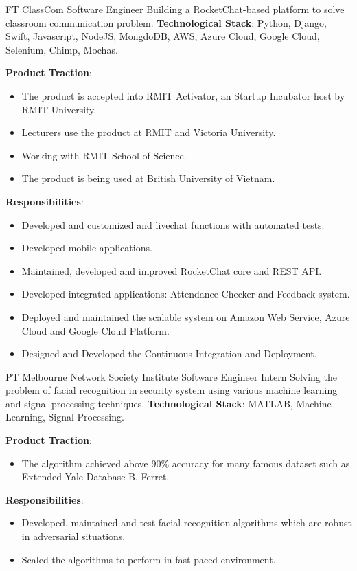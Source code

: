 \documentclass[12pt]{article} %
\begin{document}
\begin{paracol}{2}
{FT} %
{ClassCom} %
{Software Engineer} %
{Building a RocketChat-based platform to solve classroom communication problem.} %
{\textbf{Technological Stack}: Python, Django, Swift, Javascript, NodeJS, MongdoDB, AWS, Azure Cloud, Google Cloud, Selenium, Chimp, Mochas.}
{\textbf{Product Traction}: 
	\begin{itemize}
	\setlength{\itemsep}{1pt}	
	  \item The product is accepted into RMIT Activator, an Startup Incubator host by RMIT University.
	  \item Lecturers use the product at RMIT and Victoria University.
	  \item Working with RMIT School of Science.
	  \item The product is being used at British University of Vietnam.  
	\end{itemize}
\textbf{Responsibilities}:
	\begin{itemize}
	\setlength{\itemsep}{1pt}	
	  \item Developed and customized and livechat functions with automated tests.
	  \item Developed mobile applications.
	  \item Maintained, developed and improved RocketChat core and REST API.
	  \item Developed integrated applications: Attendance Checker and Feedback system.
	  \item Deployed and maintained the scalable system on Amazon Web Service, Azure Cloud and Google Cloud Platform.
	  \item Designed and Developed the Continuous Integration and Deployment.
	\end{itemize}	
}

{PT} %
{Melbourne Network Society Institute}
{Software Engineer Intern} %
{Solving the problem of facial recognition in security system using various machine learning and signal processing techniques.} 
{\textbf{Technological Stack}: MATLAB, Machine Learning, Signal Processing.} %
{\textbf{Product Traction}:
	\begin{itemize}
		\item The algorithm achieved above 90\% accuracy for many famous dataset such as Extended Yale Database B, Ferret.   
	\end{itemize}}
{\textbf{Responsibilities}:
	\begin{itemize}
		\setlength{\itemsep}{1pt}	
		\item Developed, maintained and test facial recognition algorithms which are robust in adversarial situations.
		\item Scaled the algorithms to perform in fast paced environment.   
	\end{itemize}}


\end{paracol}
\end{document}
